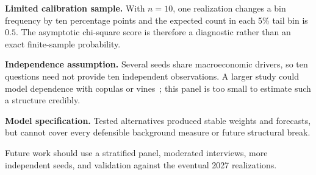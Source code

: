 \textbf{Limited calibration sample.} With $n=10$, one realization changes a bin frequency by ten percentage points and the expected count in each 5\% tail bin is $0.5$. The asymptotic chi-square score is therefore a diagnostic rather than an exact finite-sample probability.

\textbf{Independence assumption.} Several seeds share macroeconomic drivers, so ten questions need not provide ten independent observations. A larger study could model dependence with copulas or vines~\cite{wernerEtAl2017}; this panel is too small to estimate such a structure credibly.

\textbf{Model specification.} Tested alternatives produced stable weights and forecasts, but cannot cover every defensible background measure or future structural break.

Future work should use a stratified panel, moderated interviews, more independent seeds, and validation against the eventual 2027 realizations.
